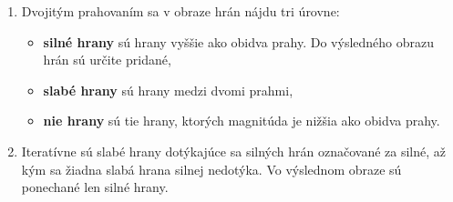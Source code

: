 \begin{enumerate}
        \item Dvojitým prahovaním sa v obraze hrán nájdu tri úrovne:
            \begin{itemize}
                \item \textbf{silné hrany} sú hrany vyššie ako obidva prahy. Do výsledného obrazu hrán sú určite pridané,
                \item \textbf{slabé hrany} sú hrany medzi dvomi prahmi,
                \item \textbf{nie hrany} sú tie hrany, ktorých magnitúda je nižšia ako obidva prahy.
            \end{itemize}
            
        \item Iteratívne sú slabé hrany dotýkajúce sa silných hrán označované za silné, až kým sa žiadna slabá hrana silnej nedotýka. Vo výslednom obraze sú ponechané len silné hrany.
    \end{enumerate}

